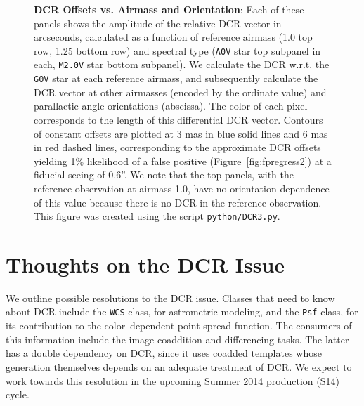 \documentclass[DM,toc]{lsstdoc}
\begin{document}
\begin{figure}[!ht]
  \caption{{\bf DCR Offsets vs. Airmass and Orientation}: Each of
    these panels shows the amplitude of the relative DCR vector in
    arcseconds, calculated as a function of reference airmass (1.0 top
    row, 1.25 bottom row) and spectral type ({\tt A0V} star top
    subpanel in each, {\tt M2.0V} star bottom subpanel).  We calculate
    the DCR w.r.t. the {\tt G0V} star at each reference airmass, and
    subsequently calculate the DCR vector at other airmasses (encoded
    by the ordinate value) and parallactic angle orientations
    (abscissa).  The color of each pixel corresponds to the length of
    this differential DCR vector.  Contours of constant offsets are
    plotted at 3 mas in blue solid lines and 6 mas in red dashed
    lines, corresponding to the approximate DCR offsets yielding 1\%
    likelihood of a false positive (Figure~\ref{fig:fpregress2}) at a
    fiducial seeing of 0.6''.  We note that the top panels, with the
    reference observation at airmass 1.0, have no orientation
    dependence of this value because there is no DCR in the reference
    observation.
%
%
    This figure was created using the script {\tt python/DCR3.py}.}
  \label{fig:fpsummary}
\end{figure}


\section{Thoughts on the DCR Issue}

We outline possible resolutions to the DCR issue.  Classes that need
to know about DCR include the {\tt WCS} class, for astrometric
modeling, and the {\tt Psf} class, for its contribution to the
color--dependent point spread function.  The consumers of this
information include the image coaddition and differencing tasks.  The
latter has a double dependency on DCR, since it uses coadded templates
whose generation themselves depends on an adequate treatment of DCR.
We expect to work towards this resolution in the upcoming Summer 2014
production (S14) cycle.
\end{document}
